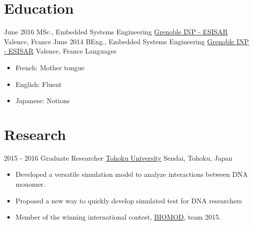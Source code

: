 \documentclass[a4paper]{template} %
\begin{document}
\makeprofile %

\section{Education}

\begin{twenty} %
	\twentyitem
    	{June 2016}
        {MSc., Embedded Systems Engineering}
        {\href{http://esisar.grenoble-inp.fr/}{Grenoble INP - ESISAR}}
        {Valence, France}
				{}
	\twentyitem
    	{June 2014}
        {BEng., Embedded Systems Engineering}
        {\href{http://esisar.grenoble-inp.fr/}{Grenoble INP - ESISAR}}
        {Valence, France}
				{}
	\twentyitem
	    	{}
	        {Languages}
	        {}
	        {}
	        {
	        {\begin{itemize}
							\item French: Mother tongue
							\item English: Fluent
							\item Japanese: Notions
			    \end{itemize}}
	        }
\end{twenty}


\section{Research}
\begin{twenty}
	\twentyitem
    	{2015 - 2016}
        {Graduate Researcher}
        {\href{http://www.tohoku.ac.jp/en/}{Tohoku University}}
        {Sendai, Tohoku, Japan}
        {
        {\begin{itemize}
        \item Developed a versatile simulation model to analyze interactions between DNA monomer.
        \item Proposed a new way to quickly develop simulated test for DNA researchers
        \item Member of the winning international contest, \href{http://biomod.net/winners/2015.html}{BIOMOD}, team 2015.
    \end{itemize}}
        }
\end{twenty}
\end{document}
